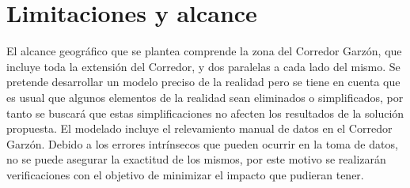%
%
%

\section{Limitaciones y alcance}

El alcance geográfico que se plantea comprende la zona del Corredor Garzón, que incluye toda la extensión del Corredor, y dos paralelas a cada lado del mismo. Se pretende desarrollar un modelo preciso de la realidad pero se tiene en cuenta que es usual que algunos elementos de la realidad sean eliminados o simplificados, por tanto se buscará que estas simplificaciones no afecten los resultados de la solución propuesta. El modelado incluye el relevamiento manual de datos en el Corredor Garzón. Debido a los errores intrínsecos que pueden ocurrir en la toma de datos, no se puede asegurar la exactitud de los mismos, por este motivo se realizarán verificaciones con el objetivo de minimizar el impacto que pudieran tener.




